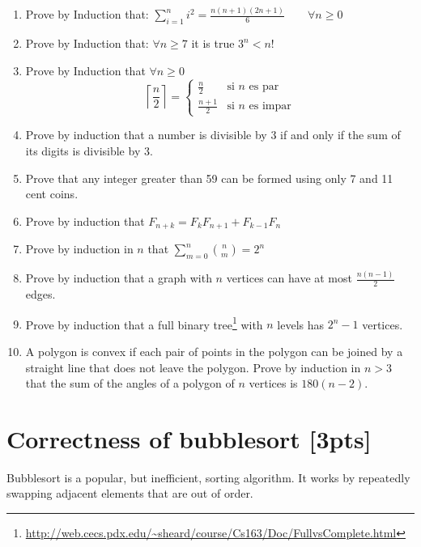 \documentclass{article}
\begin{document}
\begin{enumerate}
  \item Prove by Induction that:
  \( \sum_{i=1}^{n}i^2=\frac{n(n+1)(2n+1)}{6} \qquad\forall n \geq 0\)

  \item Prove by Induction that:
  $\forall n \geq 7$ it is true $3^n<n!$
  
  \item Prove by Induction that $\forall n \geq 0$
  \[
    \left \lceil\frac{n}{2} \right \rceil=
    \left\{
    \begin{array}{ll}
    \frac{n}{2}& \textrm{si $n$ es par}\\
    \frac{n+1}{2}& \textrm{si $n$ es impar}
    \end{array}
    \right.
  \]
  
    \item Prove by induction that a number is divisible by 3 if and only if the sum of its digits is divisible by 3.
    
    \item Prove that any integer greater than 59 can be formed using only 7 and 11 cent coins.
  
  \item Prove by induction that $F_{n+k}=F_{k}F_{n+1}+F_{k-1}F_{n}$
  
  \item Prove by induction in $n$ that \(\sum_{m=0}^{n}{n \choose m}=2^n\)
  
  \item Prove by induction that a graph with $n$ vertices can have at most  $\frac{n(n-1)}{2}$ edges.
  
  \item Prove by induction that a full binary tree\footnote{\url{http://web.cecs.pdx.edu/~sheard/course/Cs163/Doc/FullvsComplete.html}} with $n$ levels has $2^n-1$ vertices.
  
  \item A polygon is convex if each pair of points in the polygon can be joined by a straight line that does not leave the polygon. Prove by induction in $n>3$ that the sum of the angles of a polygon of $n$ vertices is $180(n-2)$.
  
\end{enumerate}

\section{Correctness of bubblesort [3pts]}
Bubblesort is a popular, but inefficient, sorting algorithm. It works by repeatedly swapping adjacent elements that are out of order.
\end{document}
